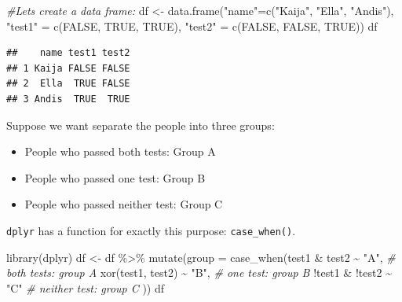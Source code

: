 \documentclass[
]{book}
\newenvironment{Shaded}{\begin{snugshade}}{\end{snugshade}}
\newcommand{\AttributeTok}[1]{\textcolor[rgb]{0.77,0.63,0.00}{#1}}
\newcommand{\CommentTok}[1]{\textcolor[rgb]{0.56,0.35,0.01}{\textit{#1}}}
\newcommand{\ConstantTok}[1]{\textcolor[rgb]{0.00,0.00,0.00}{#1}}
\newcommand{\FunctionTok}[1]{\textcolor[rgb]{0.00,0.00,0.00}{#1}}
\newcommand{\NormalTok}[1]{#1}
\newcommand{\OtherTok}[1]{\textcolor[rgb]{0.56,0.35,0.01}{#1}}
\newcommand{\SpecialCharTok}[1]{\textcolor[rgb]{0.00,0.00,0.00}{#1}}
\newcommand{\StringTok}[1]{\textcolor[rgb]{0.31,0.60,0.02}{#1}}
\providecommand{\tightlist}{%
  \setlength{\itemsep}{0pt}\setlength{\parskip}{0pt}}
\begin{document}
\begin{Shaded}
\begin{Highlighting}[]
\CommentTok{\#Let\textquotesingle{}s create a data frame:}
\NormalTok{df }\OtherTok{\textless{}{-}} \FunctionTok{data.frame}\NormalTok{(}\StringTok{"name"}\OtherTok{=}\FunctionTok{c}\NormalTok{(}\StringTok{"Kaija"}\NormalTok{, }\StringTok{"Ella"}\NormalTok{, }\StringTok{"Andis"}\NormalTok{), }\StringTok{"test1"} \OtherTok{=} \FunctionTok{c}\NormalTok{(}\ConstantTok{FALSE}\NormalTok{, }\ConstantTok{TRUE}\NormalTok{, }\ConstantTok{TRUE}\NormalTok{),}
                 \StringTok{"test2"} \OtherTok{=} \FunctionTok{c}\NormalTok{(}\ConstantTok{FALSE}\NormalTok{, }\ConstantTok{FALSE}\NormalTok{, }\ConstantTok{TRUE}\NormalTok{))}
\NormalTok{df}
\end{Highlighting}
\end{Shaded}

\begin{verbatim}
##    name test1 test2
## 1 Kaija FALSE FALSE
## 2  Ella  TRUE FALSE
## 3 Andis  TRUE  TRUE
\end{verbatim}

Suppose we want separate the people into three groups:

\begin{itemize}
\tightlist
\item
  People who passed both tests: Group A\\
\item
  People who passed one test: Group B
\item
  People who passed neither test: Group C
\end{itemize}

\texttt{dplyr} has a function for exactly this purpose: \texttt{case\_when()}.

\begin{Shaded}
\begin{Highlighting}[]
\FunctionTok{library}\NormalTok{(dplyr)}
\NormalTok{df }\OtherTok{\textless{}{-}}\NormalTok{ df }\SpecialCharTok{\%\textgreater{}\%} 
\FunctionTok{mutate}\NormalTok{(}\AttributeTok{group =} \FunctionTok{case\_when}\NormalTok{(test1 }\SpecialCharTok{\&}\NormalTok{ test2 }\SpecialCharTok{\textasciitilde{}} \StringTok{"A"}\NormalTok{, }\CommentTok{\# both tests: group A}
                         \FunctionTok{xor}\NormalTok{(test1, test2) }\SpecialCharTok{\textasciitilde{}} \StringTok{"B"}\NormalTok{, }\CommentTok{\# one test: group B}
                         \SpecialCharTok{!}\NormalTok{test1 }\SpecialCharTok{\&} \SpecialCharTok{!}\NormalTok{test2 }\SpecialCharTok{\textasciitilde{}} \StringTok{"C"} \CommentTok{\# neither test: group C}
\NormalTok{))}
\NormalTok{df}
\end{Highlighting}
\end{Shaded}
\end{document}
